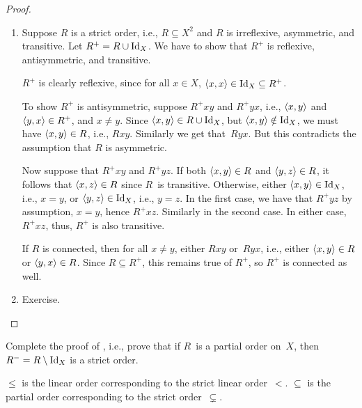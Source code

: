 \documentclass[../../../include/open-logic-section]{subfiles}
\begin{document}
\begin{proof}
  \begin{enumerate}
    \item Suppose $R$ is a strict order, i.e., $R \subseteq
      X^2$ and $R$ is irreflexive, asymmetric, and transitive. Let $R^+
      = R \cup \mathord{\mathrm{Id}_{X}}$. We have to show that $R^+$ is reflexive,
      antisymmetric, and transitive.

      $R^+$ is clearly reflexive, since for all $x \in X$, $\langle x,
        x \rangle \in \mathord{\mathrm{Id}_{X}} \subseteq R^+$.

      To show $R^+$ is antisymmetric, suppose $R^+xy$ and $R^+yx$,
      i.e., $\langle x,y \rangle$ and $\langle y, x \rangle \in R^+$, and $x \neq y$.
      Since $\langle x,y \rangle \in R \cup \mathord{\mathrm{Id}_{X}}$, but $\langle x, y \rangle \notin
      \mathord{\mathrm{Id}_{X}}$, we must have $\langle x, y \rangle \in R$, i.e.,
      $Rxy$. Similarly we get that~$Ryx$. But this contradicts the
      assumption that $R$ is asymmetric.

      Now suppose that $R^+xy$ and $R^+yz$. If both $\langle x, y \rangle \in
      R$ and $\langle y,z \rangle \in R$, it follows that $\langle x, z \rangle \in R$
      since $R$~is transitive. Otherwise, either $\langle x, y \rangle \in
      \mathord{\mathrm{Id}_{X}}$, i.e., $x = y$, or $\langle y, z \rangle \in \mathord{\mathrm{Id}_{X}}$, i.e., $y =
      z$. In the first case, we have that $R^+yz$ by assumption, $x =
      y$, hence $R^+xz$. Similarly in the second case. In either case,
      $R^+xz$, thus, $R^+$ is also transitive.

      If $R$ is connected, then for all $x \neq y$, either $Rxy$
      or~$Ryx$, i.e., either $\langle x, y \rangle \in R$ or $\langle y, x \rangle \in
      R$. Since $R \subseteq R^+$, this remains true of $R^+$, so
      $R^+$ is connected as well.
    \item Exercise.
  \end{enumerate}
\end{proof}

\begin{prob}
  Complete the proof of , i.e.,
  prove that if $R$~is a partial order on~$X$, then $R^- =
  R \setminus \mathord{\mathrm{Id}_{X}}$ is a strict order. 
\end{prob}


\begin{ex}
$\le$ is the linear order corresponding to the strict linear
  order~$<$. $\subseteq$ is the partial order corresponding to
  the strict order~$\subsetneq$.
\end{ex}
\end{document}
